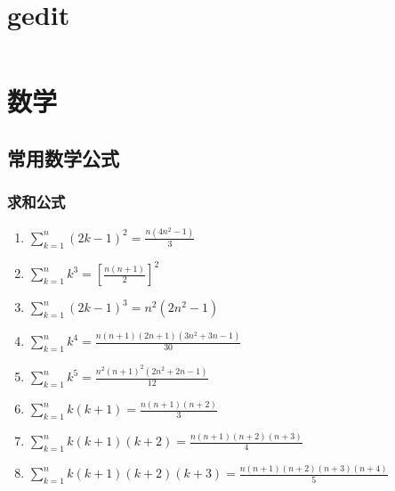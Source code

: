 \documentclass[a4paper]{article}
\newcommand{\javacode}[1]{
    \inputminted[mathescape,
    frame=lines,linenos]{java}{source/#1}
}
\begin{document}
\javacode{template.java}

\section{gedit}

\javacode{gedit.ini}



\section{数学}


\subsection{常用数学公式}

\subsubsection{求和公式}

\begin{enumerate}
	\item $\sum_{k=1}^{n}(2k-1)^2 = \frac{n(4n^2-1)}{3}	$
	\item $\sum_{k=1}^{n}k^3 = [\frac{n(n+1)}{2}]^2	$
	\item $\sum_{k=1}^{n}(2k-1)^3 = n^2(2n^2-1)	$
	\item $\sum_{k=1}^{n}k^4 = \frac{n(n+1)(2n+1)(3n^2+3n-1)}{30}  $
	\item $\sum_{k=1}^{n}k^5 = \frac{n^2(n+1)^2(2n^2+2n-1)}{12}	$
	\item $\sum_{k=1}^{n}k(k+1) = \frac{n(n+1)(n+2)}{3}	$
	\item $\sum_{k=1}^{n}k(k+1)(k+2) = \frac{n(n+1)(n+2)(n+3)}{4} $
	\item $\sum_{k=1}^{n}k(k+1)(k+2)(k+3) = \frac{n(n+1)(n+2)(n+3)(n+4)}{5} $
\end{enumerate}
\end{document}
